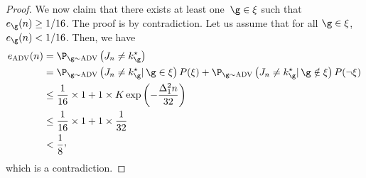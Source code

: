 \begin{proof}
	We now claim that there exists at least one~$\gainVector\in\eventc$  such that 
	$\ProErr_{\gainVector}(\timeHorizon)\geq 1/16$. 
	The proof is by contradiction. Let us assume that for 
	all $\gainVector\in\eventc$,  $\ProErr_{\gainVector}(\timeHorizon)< 1/16$. 
	Then, we have 
	\begin{align*}
	\ProErr_{\advPro}(\timeHorizon)
	&    =
	\Pro_{\gainVector\sim\advPro}\left(\recomArm_n \neq \bestArm_{\gainVector}\right)\\
	&       =
	\Pro_{\gainVector\sim\advPro}\left(\recomArm_n \neq \bestArm_{\gainVector}|\,\gainVector\in\eventc\right)
	P(\eventc)
	+
	\Pro_{\gainVector\sim\advPro}\left(\recomArm_n \neq \bestArm_{\gainVector}|\,\gainVector\notin\eventc\right)
	P(\neg\eventc)\\
	&    \leq
	\frac{1}{16}
	\times 1
	+
	1\times
	\nArms\exp\left(-\frac{\gap^2_1\timeHorizon}{32}\right)\\
	&    \leq
	\frac{1}{16}
	\times 1
	+
	1\times
	\frac{1}{32}\\
	&    <
	\frac{1}{8}\CommaBin
	\end{align*} which is a contradiction.%
\end{proof}%
